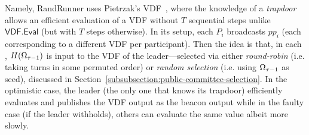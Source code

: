 Namely, RandRunner uses Pietrzak's VDF~\cite{pietrzak2018simple}, where the knowledge of a \textit{trapdoor} allows an efficient evaluation of a VDF without $T$ sequential steps unlike $\mathsf{VDF.Eval}$ (but with $T$ steps otherwise).
In its setup, each $P_i$ broadcasts $pp_i$ (each corresponding to a different VDF per participant).
Then the idea is that, in each \epoch, $H(\Omega_{\tau - 1})$ is input to the VDF of the \epoch leader---selected via either \textit{round-robin} (i.e. taking turns in some permuted order) or \textit{random selection} (i.e. using $\Omega_{\tau - 1}$ as seed), discussed in Section~\ref{subsubsection:public-committee-selection}.
In the optimistic case, the leader (the only one that knows its trapdoor) efficiently evaluates and publishes the VDF output as the beacon output while in the faulty case (if the leader withholds), others can evaluate the same value albeit more slowly.


